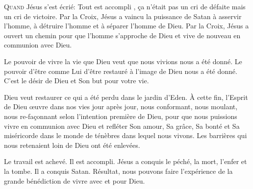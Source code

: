 \dvrule







\lettrine{Q}{uand} Jésus s'est écrié: 
 \Og Tout est accompli \Fg{}, \c{c}a n'était pas un cri de défaite
 mais un cri de victoire. Par la Croix, Jésus a vaincu la puissance
 de Satan à asservir l'homme, à détruire l'homme et à séparer l'homme de Dieu.
 Par la Croix, Jésus a ouvert un chemin pour que l'homme
 s'approche de Dieu et vive de nouveau en communion avec Dieu.

Le pouvoir de vivre la vie que Dieu veut que nous vivions nous a été donné.
 Le pouvoir d'être comme Lui \ocadr d'être restauré à l'image de Dieu \fcadr{}
 nous a été donné. C'est le désir de Dieu et Son but pour votre vie.


Dieu veut restaurer ce qui a été perdu dans le jardin d'Eden.
 À cette fin, l'Esprit de Dieu \oe{}uvre dans nos vies jour après jour,
 nous conformant, nous moulant, nous re-fa\c{c}onnant selon l'intention
 première de Dieu, pour que nous puissions vivre en communion avec Dieu
 et refléter Son amour, Sa grâce, Sa bonté et Sa miséricorde
 dans le monde de ténèbres dans lequel nous vivons.
 Les barrières qui nous retenaient loin de Dieu ont été enlevées.

Le travail est achevé. Il est accompli. Jésus a conquis le péché,
 la mort, l'enfer et la tombe. Il a conquis Satan. Résultat,
 nous pouvons faire l'expérience de la grande bénédiction de vivre avec et pour Dieu.

